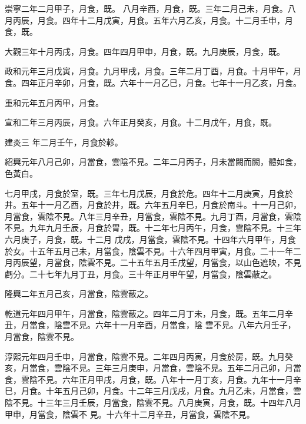 \begin{pinyinscope}
 崇寧二年二月甲子，月食，既。
 八月辛酉，月食，既。三年二月己未，月食。八月丙辰，月食。四年十二月戊寅，月食。五年六月乙亥，月食。十二月壬申，月食，既。



 大觀三年十月丙戌，月食。四年四月甲申，月食，既。九月庚辰，月食，既。



 政和元年三月戊寅，月食。九月甲戌，月食。三年二月丁酉，月食。十月甲午，月食。四年正月辛卯，月食，既。六年十一月乙巳，月食。七年十一月乙亥，月食。



 重和元年五月丙甲，月食。



 宣和二年三月丙辰，月食。六年正月癸亥，月食。十二月戊午，月食，既。



 建炎三
 年二月壬午，月食於軫。



 紹興元年八月己卯，月當食，雲陰不見。二年二月丙子，月未當闕而闕，體如食，色黃白。



 七月甲戌，月食於室，既。三年七月戊辰，月食於危。四年十二月庚寅，月食於井。五年十一月乙酉，月食於井，既。六年五月辛巳，月食於南斗。十一月己卯，月當食，雲陰不見。八年三月辛丑，月當食，雲陰不見。九月丁酉，月當食，雲陰不見。九年九月壬辰，月食於胃，既。十二年七月丙午，月食，雲陰不見。十三年六月庚子，月食，既。十二月
 戊戌，月當食，雲陰不見。十四年六月甲午，月食於女。十五年五月己未，月當食，陰雲不見。十六年四月甲寅，月食。二十一年二月丙辰望，月當食，陰雲不見。二十五年五月壬戌望，月當食，以山色遮映，不見虧分。二十七年九月丁丑，月食。三十年正月甲午望，月當食，陰雲蔽之。



 隆興二年五月己亥，月當食，陰雲蔽之。



 乾道元年四月甲午，月當食，陰雲蔽之。四年二月丁未，月食，既。五年二月辛丑，月當食，陰雲不見。六年十一月辛酉，月當食，陰
 雲不見。八年六月壬子，月當食，陰雲不見。



 淳熙元年四月壬申，月當食，陰雲不見。二年四月丙寅，月食於房，既。九月癸亥，月當食，雲陰不見。三年三月庚申，月當食，雲陰不見。五年二月己卯，月當食，雲陰不見。六年正月甲戌，月食，既。八年十一月丁亥，月食。九年十一月辛巳，月食。十年五月己卯，月食。十二年三月戊戌，月食。九月乙未，月當食，雲陰不見。十三年三月壬辰，月當食，陰雲不見。八月庚寅，月食，既。十四年八月甲申，月當食，陰雲不
 見。十六年十二月辛丑，月當食，雲陰不見。




\end{pinyinscope}

